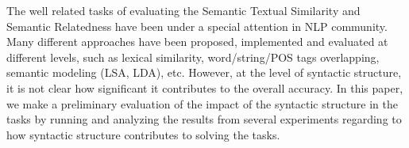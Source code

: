 The well related tasks of evaluating the Semantic Textual Similarity and Semantic Relatedness have been under a special attention in NLP community. Many different approaches have been proposed, implemented and evaluated at different levels, such as lexical similarity, word/string/POS tags overlapping, semantic modeling (LSA, LDA), etc. However, at the level of syntactic structure, it is not clear how significant it contributes to the overall accuracy. In this paper, we make a preliminary evaluation of the impact of the syntactic structure in the tasks by running and analyzing the results from several experiments regarding to how syntactic structure contributes to solving the tasks.
